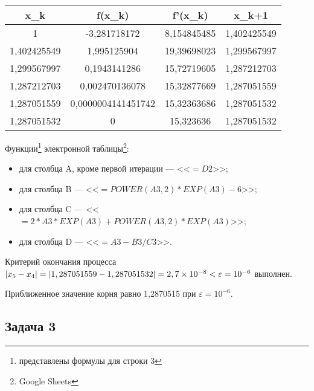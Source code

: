 \documentclass[10pt, a4paper, titlepage]{article}
\newcommand*{\hm}[1]{#1\nobreak\discretionary{}{\hbox{$\mathsurround=0pt #1$}}{}} %
\begin{document}
\begin{center}
    \begin{tabular}{|*{4}{C|}}
        \hline
        x_k & f(x_k) & f'(x_k) & x_{k+1} \\ \hline
        
        1 & -3,281718172 & 8,154845485 & 1,402425549 \\ \hline
        
        1,402425549 & 1,995125904 & 19,39698023 & 1,299567997 \\ \hline
        
        1,299567997 & 0,1943141286 & 15,72719605 & 1,287212703 \\ \hline
        
        1,287212703 & 0,002470136078 & 15,32877669 & 1,287051559 \\ \hline
        
        1,287051559 & 0,0000004141451742 & 15,32363686 & 1,287051532 \\ \hline
        
        1,287051532 & 0 & 15,323636 & 1,287051532 \\ \hline
        
    \end{tabular}
\end{center}

Функции\footnote{представлены формулы для строки 3} электронной таблицы\footnote{Google Sheets}:
\begin{itemize}
    \item для столбца A, кроме первой итерации --- <<$=D2$>>;
    
    \item для столбца B --- <<$=POWER(A3,2)*EXP(A3)-6$>>;
    
    \item для столбца C --- <<$=2*A3*EXP(A3)+POWER(A3,2)*EXP(A3)$>>;
    
    \item для столбца D --- <<$=A3-B3/C3$>>.
\end{itemize}

Критерий окончания процесса $|x_5-x_4|=|1,287051559-1,287051532 | \hm =2,7\times10^{-8}<\varepsilon=10^{-6}$ выполнен. 

Приближенное значение корня равно 1,2870515 при $\varepsilon=10^{-6}$.

\subsection{Задача 3}
\end{document}

